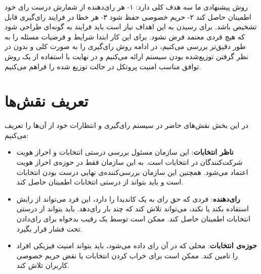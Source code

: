 روش پیشنهادی ما سه هدف کلی دارد: ۱- هر رای‌دهنده از شمارش درست رای خود اطمینان حاصل کند ۲- حریم خصوصی حفظ شود ۳- هر خطا در فرایند رای‌گیری قابل تشخیص باشد. برای رسیدن به این اهداف نیاز است باید فرایند به گونه‌ای طراحی شود که هیچ فردی معتمد فرض نشود. برای این کار ابتدا شرایط و فرضیات مسئله را به طور دقیق‌تر بررسی می‌کنیم، در ادامه روش رای‌گیری را به صورت کلی و بدون در نظر گرفتن توزیع‌شده بودن سیستم ارائه می‌کنیم و در نهایت با استفاده از یک روش توافق مناسب امنیت پروتکل در حالت توزیع شده را فراهم می‌کنیم. 
\section{تعریف نقش‌ها}
در این بخش نقش‌های حاضر در سیستم رای‌گیری و انتظارات خود از آن‌ها را تعریف می‌کنیم:
\begin{itemize}
	\item
	\textbf{ناظر انتخابات}:
	این سازمان مسئول بررسی درستی انتخابات و احراز هویت شرکت‌کنندگان در انتخابات است. به این سازمان فقط در حوزه‌ی احراز هویت اعتماد می‌شود. همچنین این سازمان بررسی‌کننده‌ی نهایی درست بودن انتخابات است و باید بتواند از درستی انتخابات اطمینان حاصل کند.
	\item
	\textbf{رای‌دهنده}:
	فردی که حق رای به یک کاندیدا را دارد، این فرد می‌تواند از رایش استفاده بکند یا نکند، می‌تواند تلاش کند که چند بار رای‌دهد. باید بتواند از درستی انتخابات اطمینان حاصل کند. ممکن است توسط یک رقیب بدخواه برای رای‌دادن تحت فشار قرار بگیرد.
	\item
	\textbf{حوزه‌ی انتخابات}:
	محلی که در آن رای داده می‌شود، باید بتواند امنیت فیزیکی افراد را تامین کند. ممکن است برای خراب کردن انتخابات یا نقض حریم خصوصی کاربران تلاش کند. 
\end{itemize}
